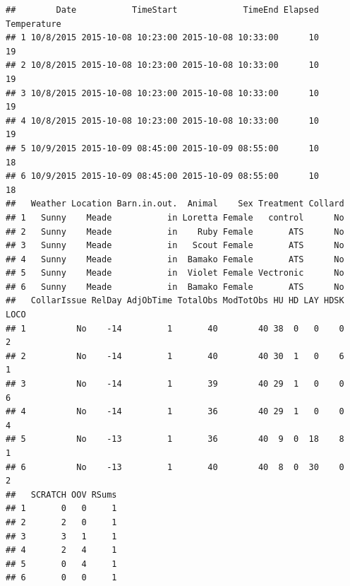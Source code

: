 \documentclass[]{article}
\begin{document}
\begin{verbatim}
##        Date           TimeStart             TimeEnd Elapsed Temperature
## 1 10/8/2015 2015-10-08 10:23:00 2015-10-08 10:33:00      10          19
## 2 10/8/2015 2015-10-08 10:23:00 2015-10-08 10:33:00      10          19
## 3 10/8/2015 2015-10-08 10:23:00 2015-10-08 10:33:00      10          19
## 4 10/8/2015 2015-10-08 10:23:00 2015-10-08 10:33:00      10          19
## 5 10/9/2015 2015-10-09 08:45:00 2015-10-09 08:55:00      10          18
## 6 10/9/2015 2015-10-09 08:45:00 2015-10-09 08:55:00      10          18
##   Weather Location Barn.in.out.  Animal    Sex Treatment Collard
## 1   Sunny    Meade           in Loretta Female   control      No
## 2   Sunny    Meade           in    Ruby Female       ATS      No
## 3   Sunny    Meade           in   Scout Female       ATS      No
## 4   Sunny    Meade           in  Bamako Female       ATS      No
## 5   Sunny    Meade           in  Violet Female Vectronic      No
## 6   Sunny    Meade           in  Bamako Female       ATS      No
##   CollarIssue RelDay AdjObTime TotalObs ModTotObs HU HD LAY HDSK LOCO
## 1          No    -14         1       40        40 38  0   0    0    2
## 2          No    -14         1       40        40 30  1   0    6    1
## 3          No    -14         1       39        40 29  1   0    0    6
## 4          No    -14         1       36        40 29  1   0    0    4
## 5          No    -13         1       36        40  9  0  18    8    1
## 6          No    -13         1       40        40  8  0  30    0    2
##   SCRATCH OOV RSums
## 1       0   0     1
## 2       2   0     1
## 3       3   1     1
## 4       2   4     1
## 5       0   4     1
## 6       0   0     1
\end{verbatim}
\end{document}
